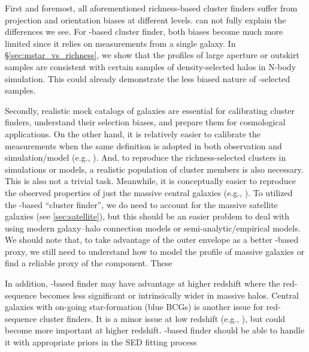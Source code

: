 \documentclass[fleqn,usenatbib,useAMS,english]{mnras}
\begin{document}
    First and foremost, all aforementioned richness-based cluster finders suffer from 
    projection and orientation biases at different levels. 
    can not fully explain the differences we see.
    For \mstar{}-based cluster finder, both biases become much more limited since it 
    relies on measurements from a single galaxy.
    In \S \ref{sec:mstar_vs_richness}, we show that the \dsigma{} profiles of large aperture or
    outskirt \mstar{} \topn{} samples are consistent with certain samples of density-selected
    halos in N-body simulation.
    This could already demonstrate the less biased nature of \mstar{}-selected samples.

    Secondly, realistic mock catalogs of galaxies are essential for calibrating cluster 
    finders, understand their selection biases, and prepare them for cosmological applications.
    On the other hand, it is relatively easier to calibrate the \mstar{} measurements when the
    same definition is adopted in both observation and simulation/model (e.g.,
    \citet{Ardila2021}).
    And, to reproduce the richness-selected clusters in simulations or models, a realistic 
    population of cluster members is also necessary. This is also not a trivial task.
    Meanwhile, it is conceptually easier to reproduce the observed properties of just the 
    massive central galaxies (e.g., \citealt{Moster2020}).
    To utilized the \mstar{}-based ``cluster finder'', we do need to account for the massive
    satellite galaxies (see \ref{sec:satellite}), but this should be an easier problem to deal
    with using modern galaxy--halo connection models or semi-analytic/empirical models.
    We should note that, to take advantage of the outer envelope \mstar{} as a better
    \mstar{}-based \mvir{} proxy, we still need to understand how to model the \mstar{} 
    profile of massive galaxies or find a reliable proxy of the \exsitu{} component.
    These 

    In addition, \mstar{}-based finder may have advantage at higher redshift where the 
    red-sequence becomes less significant or intrinsically wider in massive halos.
    Central galaxies with on-going star-formation (blue BCGs) is another issue for 
    red-sequence cluster finders. 
    It is a minor issue at low redshift (e.g., \citealt{Rykoff2014}), but could become
    more important at higher redshift.
    \mstar{}-based finder should be able to handle it with appropriate priors in the
    SED fitting process
\end{document}
